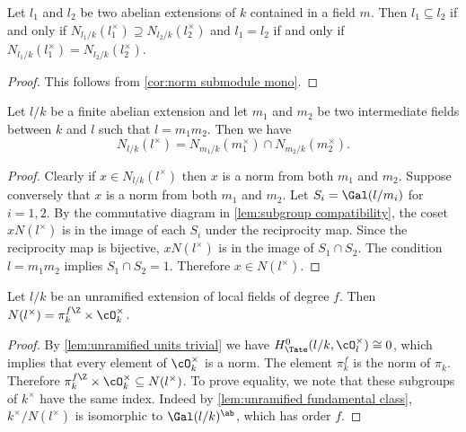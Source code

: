 \begin{theorem} \label{lem:local abelian classification}
	Let $l_1$ and $l_2$ be two abelian extensions of $k$ contained in a field $m$.
	Then $l_1 \subseteq l_2$ if and only if $N_{l_1/k}(l_1^\times) \supseteq N_{l_2/k}(l_2^\times)$
	and $l_1 = l_2$ if and only if $N_{l_1/k}(l_1^\times) = N_{l_2/k}(l_2^\times)$.
\end{theorem}

\begin{proof}
	This follows from \ref{cor:norm submodule mono}.
\end{proof}



\begin{lemma} \label{lem:norm composite intersection}
	Let $l/k$ be a finite abelian extension and let $m_1$ and $m_2$ be two intermediate
	fields between $k$ and $l$ such that $l = m_1 m_2$.
	Then we have
	\[
		N_{l/k}(l^\times) = N_{m_1/k} (m_1^\times) \cap N_{m_2/k} (m_2^\times).
	\]
\end{lemma}

\begin{proof}
	Clearly if $x \in N_{l/k}(l^\times)$ then $x$ is a norm from both $m_1$ and $m_2$.
	Suppose conversely that $x$ is a norm from both $m_1$ and $m_2$.
	Let $S_i=\Gal(l/m_i)$ for $i=1,2$.
	By the commutative diagram in \ref{lem:subgroup compatibility},
	the coset $xN(l^\times)$ is in the image of each $S_i$ under the reciprocity map.
	Since the reciprocity map is bijective, $xN(l^\times)$ is in the image of
	$S_1 \cap S_2$.
	The condition $l = m_1 m_2$ implies $S_1 \cap S_2 = 1$.
	Therefore $x \in N(l^\times)$.
\end{proof}



\begin{lemma} \label{lem:local unramified norms}
	Let $l/k$ be an unramified extension of local fields of degree $f$.
	Then $N(l^\times) = \pi_k^{f\Z} \times \cO_k^\times$.
\end{lemma}

\begin{proof}
	By \ref{lem:unramified units trivial} we have $H^0_{\Tate}(l/k,\cO_l^\times) \cong 0$,
	which implies that every element of $\cO_k^\times$ is a norm.
	The element $\pi_k^f$ is the norm of $\pi_k$.
	Therefore $\pi_k^{f\Z} \times \cO_k^\times \subseteq N(l^\times)$.
	To prove equality, we note that these subgroups of $k^\times$ have the same index.
	Indeed by \ref{lem:unramified fundamental class}, $k^\times / N(l^\times)$
	is isomorphic to $\Gal(l/k)^\ab$, which has order $f$.
\end{proof}


